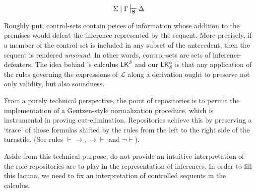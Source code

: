 \documentclass{article}                     %
\theoremstyle{theorem}
\theoremstyle{corollary}
\theoremstyle{lemma}
\theoremstyle{definition}
\theoremstyle{remark}
\theoremstyle{definition}
\theoremstyle{notation}
\theoremstyle{definition}
\theoremstyle{proposition}
\theoremstyle{definition}
\begin{document}
$$ \Sigma\mid\Gamma\sststile{\mathbf{S}}{}\Delta $$

Roughly put, control-sets contain peices of information whose addition to the premises would defeat the inference represented by the sequent.  More precisely, if a member of the control-set is included in any subset of the antecedent, then the sequent is rendered \textit{unsound}. In other words, control-sets are sets of inference-defeaters. The idea behind \textcite{Piazza2015}'s calculus $\mathsf{LK}^\mathcal{S} $ and our $\mathsf{LK}^\alpha_\mathcal{S} $ is that any application of the rules governing the expressions of $\mathcal{L}$ along a derivation ought to preserve not only validity, but also soundness.

From a purely technical perspective, the point of repositories is to permit the implementation of a Gentzen-style normalization procedure, which is instrumental in proving cut-elimination. Repositories achieve this by preserving a `trace' of those formulas shifted by the rules from the left to the right side of the turnstile. (See rules $\vdash\to, \to\vdash$ and $\neg\vdash$).

Aside from this technical purpose, \textcite{Piazza2015} do not provide an intuitive interpretation of the role repositories are to play in the representation of inferences. In order to fill this lacuna, we need to fix an interpretation of controlled sequents in the calculus. 
\end{document}
